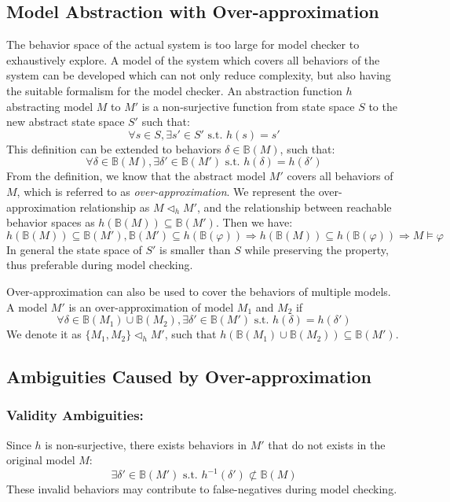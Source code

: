 \subsection{Model Abstraction with Over-approximation}
The behavior space of the actual system is too large for model checker to exhaustively explore. A model of the system which covers all behaviors of the system can be developed which can not only reduce complexity, but also having the suitable formalism for the model checker. An abstraction function $h$ abstracting model $M$ to $M'$ is a non-surjective function from state space $S$ to the new abstract state space $S'$ such that: 
$$\forall s\in S, \exists s'\in S' \text{ s.t. } h(s)=s'$$
This definition can be extended to behaviors $\delta\in \mathbb{B}(M)$, such that:
$$\forall \delta\in \mathbb{B}(M),\exists \delta'\in\mathbb{B}(M')\text{ s.t. } h(\delta)=h(\delta')$$
From the definition, we know that the abstract model $M'$ covers all behaviors of $M$, which is referred to as \emph{over-approximation}. We represent the over-approximation relationship as $M\triangleleft_h M'$, and the relationship between reachable behavior spaces as $h(\mathbb{B}(M))\subseteq\mathbb{B}(M')$. Then we have:
$$h(\mathbb{B}(M))\subseteq \mathbb{B}(M'),\mathbb{B}(M')\subseteq h(\mathbb{B}(\varphi))\Rightarrow h(\mathbb{B}(M))\subseteq h(\mathbb{B}(\varphi))\Rightarrow M\models\varphi$$
In general the state space of $S'$ is smaller than $S$ while preserving the property, thus preferable during model checking. 

Over-approximation can also be used to cover the behaviors of multiple models. A model $M'$ is an over-approximation of model $M_1$ and $M_2$ if 
$$\forall \delta\in \mathbb{B}(M_1)\cup\mathbb{B}(M_2),\exists \delta'\in\mathbb{B}(M')\text{ s.t. } h(\delta)=h(\delta')$$
We denote it as $\{M_1,M_2\}\triangleleft_h M'$, such that $h(\mathbb{B}(M_1)\cup\mathbb{B}(M_2))\subseteq\mathbb{B}(M')$.

\subsection{Ambiguities Caused by Over-approximation}
\subsubsection{Validity Ambiguities: }
Since $h$ is non-surjective, there exists behaviors in $M'$ that do not exists in the original model $M$:
$$\exists\delta'\in\mathbb{B}(M')\text{ s.t. }h^{-1}(\delta')\not\subset\mathbb{B}(M)$$
These invalid behaviors may contribute to false-negatives during model checking.
